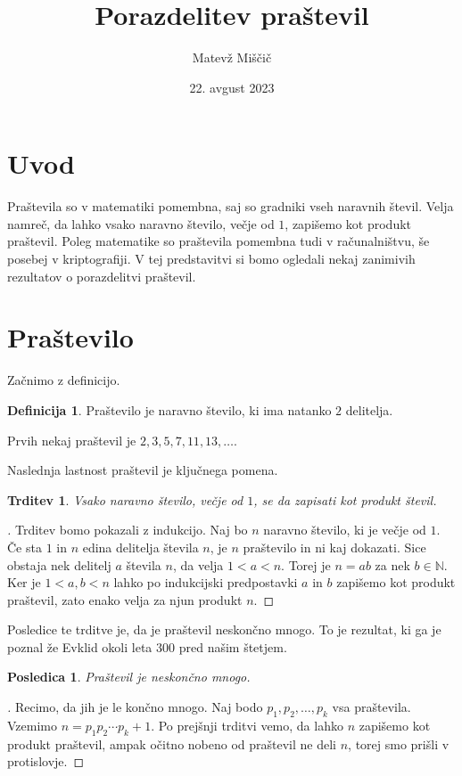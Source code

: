 \documentclass[a4paper,12pt]{article}
\title{Porazdelitev praštevil}
\author{Matevž Miščič}
\date{22. avgust 2023}
\def\N{\mathbb{N}}
\theoremstyle{definition}
\newtheorem{definicija}{Definicija}
\theoremstyle{plain}
\newtheorem{trditev}{Trditev}
\newtheorem{posledica}{Posledica}
\newenvironment{dokaz}{\begin{proof}[\bfseries\upshape\proofname]}{\end{proof}}
\begin{document}
\maketitle{}

\section{Uvod}
Praštevila so v matematiki pomembna, saj so gradniki vseh naravnih števil. Velja namreč, da lahko vsako naravno število, večje od $1$, zapišemo kot produkt praštevil. Poleg matematike so praštevila pomembna tudi v računalništvu, še posebej v kriptografiji. V tej predstavitvi si bomo ogledali nekaj zanimivih rezultatov o porazdelitvi praštevil.



\section{Praštevilo}

Začnimo z definicijo.

\begin{definicija}
    Praštevilo je naravno število, ki ima natanko $2$ delitelja.
\end{definicija}
Prvih nekaj praštevil je $2, 3, 5, 7, 11, 13, \ldots$.

Naslednja lastnost praštevil je ključnega pomena.

\begin{trditev}
    \label{factorisation}
    Vsako naravno število, večje od $1$, se da zapisati kot produkt števil.
\end{trditev}
\begin{dokaz}
    Trditev bomo pokazali z indukcijo. Naj bo $n$ naravno število, ki je večje od $1$. Če sta $1$ in $n$ edina delitelja števila $n$, je $n$ praštevilo in ni kaj dokazati. Sice obstaja nek delitelj $a$ števila $n$, da velja $1 < a < n$. Torej je $n = ab$ za nek $b \in \N$. Ker je $1 < a, b < n$ lahko po indukcijski predpostavki $a$ in $b$ zapišemo kot produkt praštevil, zato enako velja za njun produkt $n$.
\end{dokaz}

Posledice te trditve je, da je praštevil neskončno mnogo. To je rezultat, ki ga je poznal že Evklid okoli leta 300 pred našim štetjem.

\begin{posledica}
    Praštevil je neskončno mnogo.
\end{posledica}
\begin{dokaz}
    Recimo, da jih je le končno mnogo. Naj bodo $p_1, p_2, \ldots, p_k$ vsa praštevila. Vzemimo $n = p_1p_2 \cdots p_k + 1$. Po prejšnji trditvi vemo, da lahko $n$ zapišemo kot produkt praštevil, ampak očitno nobeno od praštevil ne deli $n$, torej smo prišli v protislovje.
\end{dokaz}
\end{document}
